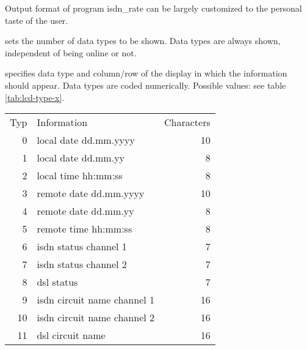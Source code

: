 \begin{description}

      Output format of program isdn\_rate can be largely customized to the personal 
      taste of the user.

       sets the number of data types to be shown.
      Data types are always shown, independent of being online or not.



         specifies data type and column/row of the 
        display in which the information should appear. Data types are coded 
        numerically. Possible values: see table \ref{tab:lcd-type-x}.

        \begin{table}[htbp]
          \begin{small}
          \begin{center}
            \begin{tabular}{rlr}
               Typ &     Information   &             Characters\\


                0 &       local date dd.mm.yyyy           & 10 \\
                1 &       local date dd.mm.yy             &  8 \\
                2 &       local time hh:mm:ss             &  8 \\

                3 &       remote date dd.mm.yyyy          & 10 \\
                4 &       remote date dd.mm.yy            &  8 \\
                5 &       remote time hh:mm:ss            &  8 \\

                6 &       isdn status channel 1           &  7 \\
                7 &       isdn status channel 2           &  7 \\
                8 &       dsl status                      &  7 \\

                9 &       isdn circuit name channel 1     & 16 \\
                10 &      isdn circuit name channel 2     & 16 \\
                11 &      dsl circuit name                & 16 \\


\end{tabular}
\end{center}
\end{small}
\end{table}
\end{description}

